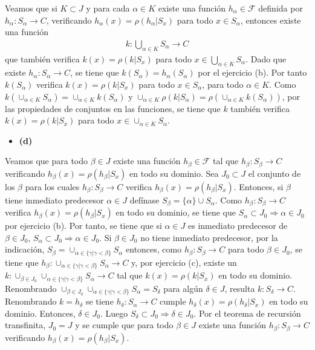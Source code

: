 \documentclass{article}
\begin{document}
Veamos que si $K\subset J$ y para cada $\alpha\in K$ existe una función $h_{\alpha}\in \mathcal{F}$ definida por $h_{\alpha}:S_{\alpha}\rightarrow C$, verificando $h_\alpha(x)=\rho(h_\alpha|S_x)$ para todo $x\in S_\alpha$, entonces existe una función 
\begin{eqnarray}
k:\bigcup_{\alpha \in K}S_{\alpha}\rightarrow C\nonumber
\end{eqnarray}
que también verifica $k(x)=\rho(k|S_x)$ para todo $x\in \bigcup_{\alpha \in K}S_{\alpha}$. Dado que existe $h_{\alpha}:S_{\alpha}\rightarrow C$, se tiene que $k(S_{\alpha})=h_{\alpha}(S_{\alpha})$ por el ejercicio (b). Por tanto $k(S_{\alpha})$ verifica $k(x)=\rho(k|S_x)$ para todo $x\in S_\alpha$, para todo $\alpha \in K$. Como $k(\cup_{\alpha \in K}S_{\alpha})=\cup_{\alpha \in K}k(S_{\alpha})$ y $\cup_{\alpha \in K}\rho(k|S_\alpha)=\rho\left(\cup_{\alpha \in K}k(S_\alpha)\right)$, por las propiedades de conjuntos en las funciones, se tiene que $k$ también verifica $k(x)=\rho(k|S_x)$ para todo $x\in \cup_{\alpha \in K}S_{\alpha}$.
\begin{itemize}
\item \bf(d)\rm
\end{itemize}
Veamos que para todo $\beta \in J$ existe una función $h_\beta\in\mathcal{F}$ tal que $h_\beta:S_\beta\rightarrow C$ verificando $h_\beta(x)=\rho(h_\beta|S_x)$ en todo su dominio. Sea $J_0\subset J$ el conjunto de los $\beta$ para los cuales $h_{\beta}:S_{\beta}\rightarrow C$ verifica $h_\beta(x)=\rho(h_\beta|S_x)$. Entonces, si $\beta$ tiene inmediato predecesor $\alpha\in J$ defínase $S_{\beta}=\{\alpha\}\cup S_{\alpha}$. Como $h_{\beta}:S_{\beta}\rightarrow C$ verifica $h_\beta(x)=\rho(h_\beta|S_x)$ en todo su dominio, se tiene que  $S_{\alpha}\subset J_0\Rightarrow \alpha \in J_0$ por ejercicio (b). Por tanto, se tiene que si $\alpha\in J$ es inmediato predecesor de $\beta\in J_0$, $S_{\alpha}\subset J_0\Rightarrow \alpha \in J_0$.
Si $\beta\in J_0$ no tiene inmediato predecesor, por la indicación, $S_{\beta}=\cup_{\alpha\in\{\gamma|\gamma<\beta\}}S_\alpha$ entonces, como $h_{\beta}:S_{\beta}\rightarrow C$ para todo $\beta\in J_0$, se tiene que $h_{\beta}: \cup_{\alpha\in\{\gamma|\gamma<\beta\}}S_\alpha\rightarrow C$ y, por ejercicio (c), existe un $k:\cup_{\beta\in J_0}\cup_{\alpha\in\{\gamma|\gamma<\beta\}}S_\alpha\rightarrow C$ tal que $k(x)=\rho(k|S_x)$ en todo su dominio. Renombrando $\cup_{\beta\in J_0}\cup_{\alpha\in\{\gamma|\gamma<\beta\}}S_\alpha=S_\delta$ para algún $\delta \in J$, resulta $k:S_{\delta}\rightarrow C$. Renombrando $k=h_{\delta}$ se tiene $h_{\delta}:S_{\alpha}\rightarrow C$ cumple $h_\delta(x)=\rho(h_\delta|S_x)$ en todo su dominio. Entonces, $\delta \in J_0$. Luego $S_{\delta}\subset J_0\Rightarrow \delta \in J_0$. Por el teorema de recursión transfinita, $J_0=J$ y se cumple que para todo $\beta \in J$ existe una función $h_{\beta}:S_{\beta}\rightarrow C$ verificando $h_\beta(x)=\rho(h_\beta|S_x)$.
\end{document}
